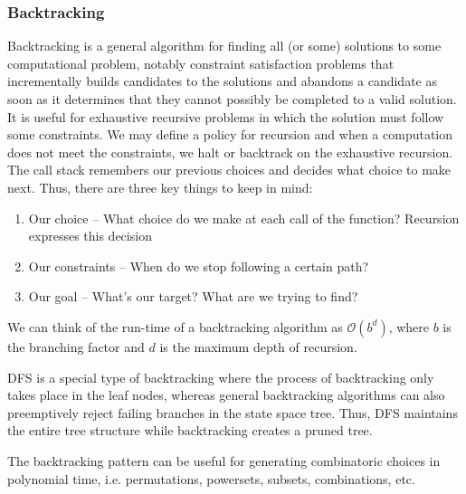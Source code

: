 \documentclass{article}
\newcommand{\bigO}{\mathcal{O}}
\begin{document}
    \subsubsection{Backtracking}
    Backtracking is a general algorithm for finding all (or some) solutions to some computational problem, notably constraint satisfaction problems that incrementally builds candidates to the solutions and abandons a candidate as soon as it determines that they cannot possibly be completed to a valid solution. It is useful for exhaustive recursive problems in which the solution must follow some constraints. We may define a policy for recursion and when a computation does not meet the constraints, we halt or backtrack on the exhaustive recursion. The call stack remembers our previous choices and decides what choice to make next. Thus, there are three key things to keep in mind:
    \begin{enumerate}
        \item Our choice -- What choice do we make at each call of the function? Recursion expresses this decision
        \item Our constraints -- When do we stop following a certain path?
        \item Our goal -- What's our target? What are we trying to find?
    \end{enumerate}
    
    We can think of the run-time of a backtracking algorithm as $\bigO(b^d)$, where $b$ is the branching factor and $d$ is the maximum depth of recursion.

    DFS is a special type of backtracking where the process of backtracking only takes place in the leaf nodes, whereas general backtracking algorithms can also preemptively reject failing branches in the state space tree. Thus, DFS maintains the entire tree structure while backtracking creates a pruned tree.
    
    The backtracking pattern can be useful for generating combinatoric choices in polynomial time, i.e. permutations, powersets, subsets, combinations, etc.
    
\end{document}
